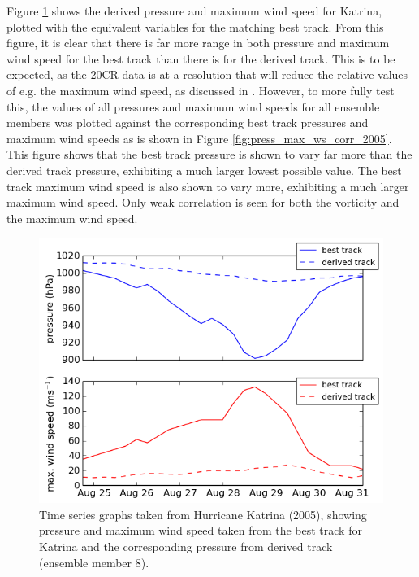 \documentclass[pdftex,12pt,a4paper]{report}
\begin{document}
Figure \ref{fig:katrina_best_derived_comparison} shows the derived pressure and maximum wind speed
for Katrina, plotted with the equivalent variables for the matching best track. From this figure, it
is clear that there is far more range in both pressure and maximum wind speed for the best
track than there is for the derived track. This is to be expected, as the 20CR data is at a
resolution that will reduce the relative values of e.g. the maximum wind speed, as discussed in
\textcite{walsh2007objectively}. However, to more fully test this, the values of all pressures and maximum wind
speeds for all ensemble members was plotted against the corresponding best track pressures and
maximum wind speeds as is shown in Figure \ref{fig:press_max_ws_corr_2005}. This figure shows that
the best track pressure is shown to vary far more than the derived track pressure, exhibiting a much
larger lowest possible value. The best track maximum wind speed is also shown to vary more,
exhibiting a much larger maximum wind speed. Only weak correlation is seen for both the vorticity
and the maximum wind speed.

\begin{figure}[hb!]
    \centering
    \includegraphics[width=\textwidth]{figures/katrina_best_derived_comparison}
    \vspace{-10pt}
    \caption{Time series graphs taken from Hurricane Katrina (2005), showing pressure and maximum
            wind speed taken from the best track for Katrina and the corresponding pressure from derived
            track (ensemble member 8). }
    \label{fig:katrina_best_derived_comparison}
    \vspace{-10pt}
\end{figure}
\end{document}

